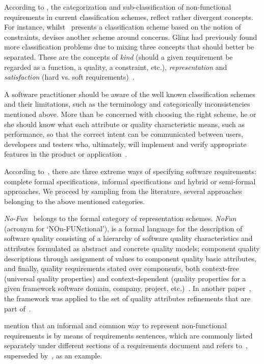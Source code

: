 \documentclass[dissertation,final]{softeng}
\begin{document}
{According to \citet{Glinz:2007ehba}, the categorization and sub-classification of non-functional requirements in current classification schemes, reflect rather divergent concepts. For instance, whilst~\citet{Roman:1985} presents a classification scheme based on the notion of constraints, \citet{adams2015non} devises another scheme around concerns. Glinz had previously found more classification problems due to mixing three concepts that should better be separated. These are the concepts of \emph{kind} (should a given requirement be regarded as a function, a quality, a constraint, etc.), \emph{representation} and \emph{satisfaction} (hard vs. soft requirements)~\citep{Glinz:2005unba}.

A software practitioner should be aware of the well known classification schemes and their limitations, such as the terminology and categorically inconsistencies mentioned above. More than be concerned with choosing the right scheme, he or she should know what each attribute or quality characteristic means, such as performance, so that the correct intent can be communicated between users, developers and testers who, ultimately, will implement and verify appropriate features in the product or application~\citep{Chung:2009vg}.

According to~\citet{Matoussi:2008wr}, there are three extreme ways of specifying software requirements: complete formal specifications, informal specifications and hybrid or semi-formal approaches. We proceed by sampling from the literature, several approaches belonging to the above mentioned categories.

\emph{No-Fun}~\citep{Franch1998} belongs to the formal category of representation schemes. \emph{NoFun} (acronym for `NOn-FUNctional'), is a formal language for the description of software quality consisting of a hierarchy of software quality characteristics and attributes formulated as abstract and concrete quality models; component quality descriptions through assignment of values to component quality basic attributes, and finally, quality requirements stated over components, both context-free (universal quality properties) and context-dependent (quality properties for a given framework software domain, company, project, etc.)~\citep{Franch1998}. In another paper~\cite{NoFunWithISO}, the framework was applied to the set of quality attributes refinements that are part of~\citet{ieee_std_9126One}.

\citet{Chung:2009vg} mention that an informal and common way to represent non-functional requirements is by means of requirements sentences, which are commonly listed separately under different sections of a requirements document and refers to~, superseded by~, as an example.

}
\end{document}

